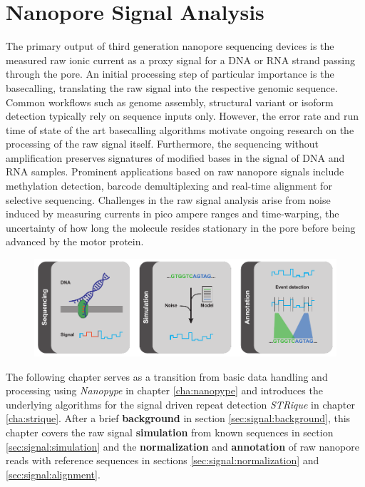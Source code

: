 \chapter{Nanopore Signal Analysis}
\label{cha:signal}

The primary output of third generation nanopore sequencing devices is the measured raw ionic current as a proxy signal for a DNA or RNA strand passing through the pore. 
An initial processing step of particular importance is the basecalling, translating the raw signal into the respective genomic sequence.
Common workflows such as genome assembly, structural variant or isoform detection typically rely on sequence inputs only.
However, the error rate and run time of state of the art basecalling algorithms motivate ongoing research on the processing of the raw signal itself. Furthermore, the sequencing without amplification preserves signatures of modified bases in the signal of DNA and RNA samples.
Prominent applications based on raw nanopore signals include methylation detection, barcode demultiplexing and real-time alignment for selective sequencing.
Challenges in the raw signal analysis arise from noise induced by measuring currents in pico ampere ranges and time-warping, the uncertainty of how long the molecule resides stationary in the pore before being advanced by the motor protein.


\begin{figure}[h]
    \centering
    \includegraphics[width=1.0\textwidth]{figures/signal/GA.pdf}
    \label{fig:signal:ga}
\end{figure}


The following chapter serves as a transition from basic data handling and processing using \textit{Nanopype} in chapter \ref{cha:nanopype} and introduces the underlying algorithms for the signal driven repeat detection \textit{STRique} in chapter \ref{cha:strique}.
After a brief \textbf{background} in section \ref{sec:signal:background}, this chapter covers the raw signal \textbf{simulation} from known sequences in section \ref{sec:signal:simulation} and the \textbf{normalization} and \textbf{annotation} of raw nanopore reads with reference sequences in sections \ref{sec:signal:normalization} and \ref{sec:signal:alignment}.

